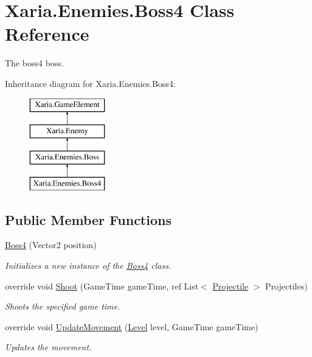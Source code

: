 \hypertarget{classXaria_1_1Enemies_1_1Boss4}{}\section{Xaria.\+Enemies.\+Boss4 Class Reference}
\label{classXaria_1_1Enemies_1_1Boss4}


The boss4 boss.  


Inheritance diagram for Xaria.\+Enemies.\+Boss4\+:\begin{figure}[H]
\begin{center}
\leavevmode
\includegraphics[height=4.000000cm]{classXaria_1_1Enemies_1_1Boss4}
\end{center}
\end{figure}
\subsection*{Public Member Functions}
\begin{DoxyCompactItemize}
\item 
\hyperlink{classXaria_1_1Enemies_1_1Boss4_a901cd427346d2eb5bb199079d3da988c}{Boss4} (Vector2 position)
\begin{DoxyCompactList}\small\item\em Initializes a new instance of the \hyperlink{classXaria_1_1Enemies_1_1Boss4}{Boss4} class. \end{DoxyCompactList}\item 
override void \hyperlink{classXaria_1_1Enemies_1_1Boss4_a8f2416704b32c1ceedfa08b7e226924e}{Shoot} (Game\+Time game\+Time, ref List$<$ \hyperlink{classXaria_1_1Projectile}{Projectile} $>$ Projectiles)
\begin{DoxyCompactList}\small\item\em Shoots the specified game time. \end{DoxyCompactList}\item 
override void \hyperlink{classXaria_1_1Enemies_1_1Boss4_a7962281c412a9192916819e463d625d2}{Update\+Movement} (\hyperlink{classXaria_1_1Level}{Level} level, Game\+Time game\+Time)
\begin{DoxyCompactList}\small\item\em Updates the movement. \end{DoxyCompactList}\end{DoxyCompactItemize}
